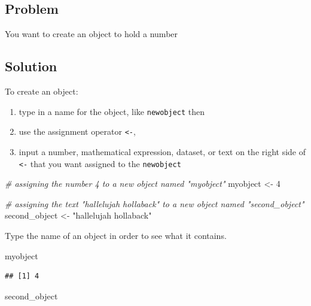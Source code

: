 \documentclass[
]{book}
\newenvironment{Shaded}{\begin{snugshade}}{\end{snugshade}}
\newcommand{\CommentTok}[1]{\textcolor[rgb]{0.56,0.35,0.01}{\textit{#1}}}
\newcommand{\DecValTok}[1]{\textcolor[rgb]{0.00,0.00,0.81}{#1}}
\newcommand{\NormalTok}[1]{#1}
\newcommand{\OtherTok}[1]{\textcolor[rgb]{0.56,0.35,0.01}{#1}}
\newcommand{\StringTok}[1]{\textcolor[rgb]{0.31,0.60,0.02}{#1}}
\providecommand{\tightlist}{%
  \setlength{\itemsep}{0pt}\setlength{\parskip}{0pt}}
\begin{document}
\hypertarget{problem-1}{%
\subsection{Problem}\label{problem-1}}

You want to create an object to hold a number

\hypertarget{solution-1}{%
\subsection{Solution}\label{solution-1}}

To create an object:

\begin{enumerate}
\def\labelenumi{\arabic{enumi}.}
\tightlist
\item
  type in a name for the object, like \texttt{newobject} then
\item
  use the assignment operator \texttt{\textless{}-},
\item
  input a number, mathematical expression, dataset, or text on the right side of \texttt{\textless{}-} that you want assigned to the \texttt{newobject}
\end{enumerate}

\begin{Shaded}
\begin{Highlighting}[]
\CommentTok{\# assigning the number 4 to a new object named "myobject"}
\NormalTok{myobject }\OtherTok{\textless{}{-}} \DecValTok{4}

\CommentTok{\# assigning the text "hallelujah hollaback" to a new object named "second\_object"}
\NormalTok{second\_object }\OtherTok{\textless{}{-}} \StringTok{"hallelujah hollaback"}
\end{Highlighting}
\end{Shaded}

Type the name of an object in order to see what it contains.

\begin{Shaded}
\begin{Highlighting}[]
\NormalTok{myobject}
\end{Highlighting}
\end{Shaded}

\begin{verbatim}
## [1] 4
\end{verbatim}

\begin{Shaded}
\begin{Highlighting}[]
\NormalTok{second\_object}
\end{Highlighting}
\end{Shaded}
\end{document}
